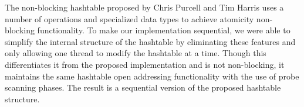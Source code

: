 \documentclass[journal]{IEEEtran}
\begin{document}
The non-blocking hashtable proposed by Chris Purcell and Tim Harris uses a number of operations and specialized data types to achieve atomicity non-blocking functionality.  To make our implementation sequential, we were able to simplify the internal structure of the hashtable by eliminating these features and only allowing one thread to modify the hashtable at a time. Though this differentiates it from the proposed implementation and is not non-blocking, it maintains the same hashtable open addressing functionality with the use of probe scanning phases. The result is a sequential version of the proposed hashtable structure.


\ifCLASSOPTIONcaptionsoff
  \newpage
\fi



\end{document}
